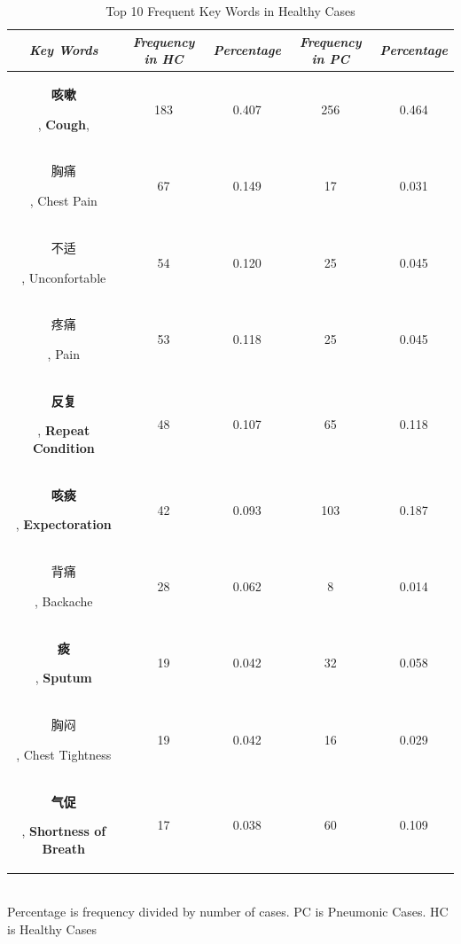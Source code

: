 \documentclass[journal]{IEEEtran}
\begin{document}
\begin{table}[htb]
    \vspace{-0cm}
    \caption{Top 10 Frequent Key Words in Healthy Cases}
    \vspace{-0cm}
    \begin{center}
    \begin{tabular}{|c|c|c|c|c|}
        \hline
        \textbf{\textit{Key Words}} & \textbf{\textit{Frequency in HC}} & \textbf{\textit{Percentage}}& \textbf{\textit{Frequency in PC}}& \textbf{\textit{Percentage}} \\
    \hline
    \begin{CJK}{UTF8}{gbsn}\textbf{咳嗽}\end{CJK}, \textbf{Cough},  & 183 & 0.407 & 256 & 0.464\\
    \begin{CJK}{UTF8}{gbsn}胸痛\end{CJK}, Chest Pain & 67 & 0.149 & 17 & 0.031\\
    \begin{CJK}{UTF8}{gbsn}不适\end{CJK}, Unconfortable & 54 & 0.120 & 25 & 0.045\\
    \begin{CJK}{UTF8}{gbsn}疼痛\end{CJK}, Pain & 53 & 0.118 & 25 & 0.045\\
    \begin{CJK}{UTF8}{gbsn}\textbf{反复}\end{CJK}, \textbf{Repeat Condition} & 48 & 0.107 & 65 & 0.118\\
    \begin{CJK}{UTF8}{gbsn}\textbf{咳痰}\end{CJK}, \textbf{Expectoration} & 42 & 0.093 & 103 & 0.187\\
    \begin{CJK}{UTF8}{gbsn}背痛\end{CJK}, Backache & 28 & 0.062 & 8 & 0.014\\
    \begin{CJK}{UTF8}{gbsn}\textbf{痰}\end{CJK}, \textbf{Sputum}& 19 & 0.042 & 32 & 0.058\\
    \begin{CJK}{UTF8}{gbsn}胸闷\end{CJK}, Chest Tightness & 19 & 0.042 & 16 & 0.029\\
    \begin{CJK}{UTF8}{gbsn}\textbf{气促}\end{CJK}, \textbf{Shortness of Breath}& 17 & 0.038 & 60 & 0.109\\
    
    \hline
    \end{tabular}
    \vspace{0.1cm}
    \label{frequency2}\\
    \footnotesize{Percentage is frequency divided by number of cases. PC is Pneumonic Cases. HC is Healthy Cases}

    \end{center}
    \vspace{-0.0cm}
    \end{table}
\end{document}
